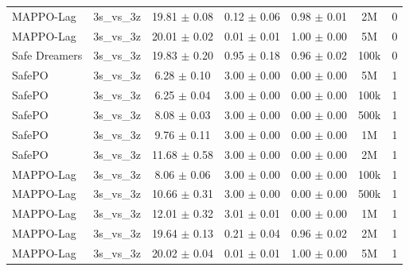 \begin{longtable}{lcccccc}
MAPPO-Lag & 3s\_vs\_3z & \textcolor{green!60!black}{19.81 $\pm$ 0.08} & \textcolor{red!70!black}{0.12 $\pm$ 0.06} & \textcolor{red!70!black}{0.98 $\pm$ 0.01} & 2M & 0 \\
MAPPO-Lag & 3s\_vs\_3z & \textcolor{red!70!black}{20.01 $\pm$ 0.02} & \textcolor{red!70!black}{0.01 $\pm$ 0.01} & \textcolor{red!70!black}{1.00 $\pm$ 0.00} & 5M & 0 \\
Safe Dreamers & 3s\_vs\_3z & 19.83 $\pm$ 0.20 & 0.95 $\pm$ 0.18 & 0.96 $\pm$ 0.02 & 100k & 0 \\
\midrule
SafePO & 3s\_vs\_3z & \textcolor{green!60!black}{6.28 $\pm$ 0.10} & \textcolor{green!60!black}{3.00 $\pm$ 0.00} & \textcolor{green!60!black}{0.00 $\pm$ 0.00} & 5M & 1 \\
SafePO & 3s\_vs\_3z & \textcolor{green!60!black}{6.25 $\pm$ 0.04} & \textcolor{green!60!black}{3.00 $\pm$ 0.00} & \textcolor{green!60!black}{0.00 $\pm$ 0.00} & 100k & 1 \\
SafePO & 3s\_vs\_3z & \textcolor{green!60!black}{8.08 $\pm$ 0.03} & \textcolor{green!60!black}{3.00 $\pm$ 0.00} & \textcolor{green!60!black}{0.00 $\pm$ 0.00} & 500k & 1 \\
SafePO & 3s\_vs\_3z & \textcolor{green!60!black}{9.76 $\pm$ 0.11} & \textcolor{green!60!black}{3.00 $\pm$ 0.00} & \textcolor{green!60!black}{0.00 $\pm$ 0.00} & 1M & 1 \\
SafePO & 3s\_vs\_3z & \textcolor{green!60!black}{11.68 $\pm$ 0.58} & \textcolor{green!60!black}{3.00 $\pm$ 0.00} & \textcolor{green!60!black}{0.00 $\pm$ 0.00} & 2M & 1 \\
MAPPO-Lag & 3s\_vs\_3z & \textcolor{green!60!black}{8.06 $\pm$ 0.06} & \textcolor{green!60!black}{3.00 $\pm$ 0.00} & \textcolor{green!60!black}{0.00 $\pm$ 0.00} & 100k & 1 \\
MAPPO-Lag & 3s\_vs\_3z & \textcolor{green!60!black}{10.66 $\pm$ 0.31} & \textcolor{green!60!black}{3.00 $\pm$ 0.00} & \textcolor{green!60!black}{0.00 $\pm$ 0.00} & 500k & 1 \\
MAPPO-Lag & 3s\_vs\_3z & \textcolor{green!60!black}{12.01 $\pm$ 0.32} & \textcolor{green!60!black}{3.01 $\pm$ 0.01} & \textcolor{green!60!black}{0.00 $\pm$ 0.00} & 1M & 1 \\
MAPPO-Lag & 3s\_vs\_3z & \textcolor{green!60!black}{19.64 $\pm$ 0.13} & \textcolor{red!70!black}{0.21 $\pm$ 0.04} & \textcolor{green!60!black}{0.96 $\pm$ 0.02} & 2M & 1 \\
MAPPO-Lag & 3s\_vs\_3z & \textcolor{red!70!black}{20.02 $\pm$ 0.04} & \textcolor{red!70!black}{0.01 $\pm$ 0.01} & \textcolor{red!70!black}{1.00 $\pm$ 0.00} & 5M & 1 \\

\end{longtable}
